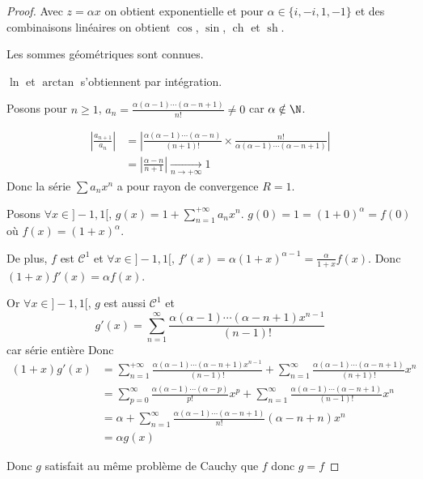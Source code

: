 \begin{proof}
    Avec $z = \alpha x$ on obtient exponentielle et pour $\alpha \in \{i, -i, 1, -1\}$ et des combinaisons linéaires on obtient 
    $\cos$, $\sin$, $\operatorname{ch}$ et $\operatorname{sh}$.

    Les sommes géométriques sont connues. 

    $\ln$ et $\arctan$ s'obtiennent par intégration. 

    Posons pour $n \geqslant 1$, $a_n = \frac{\alpha (\alpha - 1) \cdots (\alpha - n + 1)}{n!} \neq 0$ 
    car $\alpha \notin \N$.  

    \begin{align}
        \left| \frac{a_{n + 1}}{a_n} \right| & = \left| \frac{\alpha (\alpha - 1) \cdots (\alpha - n)}{(n + 1)!} \times \frac{n!}{\alpha (\alpha - 1) \cdots (\alpha - n + 1)} \right| \\
        & = \left| \frac{\alpha - n }{n + 1} \right| \xrightarrow[n \to + \infty]{} 1
    \end{align}
    Donc la série $\sum a_n x^n$ a pour rayon de convergence $R = 1$.

    Posons $\displaystyle \forall x \in ]-1, 1[, \, g(x) = 1 + \sum_{n = 1}^{+\infty} a_n x^n$. 
    $g(0) = 1 = (1 + 0)^\alpha = f(0)$ où $f(x) = (1 + x)^\alpha$. 

    De plus, $f$ est $\mathscr C^1$ et $\forall x \in ]-1, 1[, \, f'(x) = \alpha (1 + x)^{\alpha - 1} = \frac \alpha {1 + x} f(x)$.
    Donc $(1 + x) f'(x) = \alpha f(x)$. 

    Or $\forall x \in ]-1, 1[, \, g$ est aussi $\mathscr C^1$ et
    $$ g'(x) = \sum_{n = 1 }^{\infty   } \frac{\alpha (\alpha - 1) \cdots (\alpha - n + 1) x^{n - 1}}{(n - 1 )! }$$ car série entière 
    Donc 
    \begin{align}
        (1 + x) g'(x) & = \displaystyle \sum_{n = 1 }^{+ \infty   } \frac{\alpha (\alpha - 1) \cdots (\alpha - n + 1) x^{n - 1}}{(n - 1)!} + \sum_{n = 1 }^{\infty   } \frac{\alpha (\alpha - 1) \cdots (\alpha - n + 1) }{(n + 1)!} x^n \\
        & = \sum_{p = 0 }^{\infty    } \frac{\alpha (\alpha - 1) \cdots (\alpha - p)}{p!} x^p + \sum_{n = 1 }^{\infty   } \frac{\alpha (\alpha - 1) \cdots (\alpha - n + 1)}{(n - 1)!} x^n \\
        & = \alpha + \sum_{n = 1 }^{\infty   } \frac{\alpha (\alpha - 1) \cdots (\alpha - n + 1)}{n! } (\alpha - n + n) x^n \\
        & = \alpha g(x)
    \end{align}

    Donc $g$ satisfait au même problème de Cauchy que $f$ donc $g = f$ 
\end{proof}